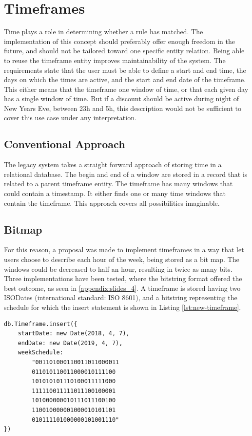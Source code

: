 \section{Timeframes}
Time plays a role in determining whether a rule has matched. The implementation of this concept should preferably offer enough freedom in the future, and should not be tailored toward one specific entity relation. Being able to reuse the timeframe entity improves maintainability of the system. The requirements state that the user must be able to define a start and end time, the days on which the times are active, and the start and end date of the timeframe. This either means that the timeframe one window of time, or that each given day has a single window of time. But if a discount should be active during night of New Years Eve, between 23h and 5h, this description would not be sufficient to cover this use case under any interpretation.

\subsection{Conventional Approach}
The legacy system takes a straight forward approach of storing time in a relational database. The begin and end of a window are stored in a record that is related to a parent timeframe entity. The timeframe has many windows that could contain a timestamp. It either finds one or many time windows that contain the timeframe. This approach covers all possibilities imaginable.

\subsection{Bitmap}
For this reason, a proposal was made to implement timeframes in a way that let users choose to describe each hour of the week, being stored as a bit map. The windows could be decreased to half an hour, resulting in twice as many bits. Three implementations have been tested, where the bitstring format offered the best outcome, as seen in \ref{appendix:slides_4}. A timeframe is stored having two ISODates (international standard: ISO 8601), and a bitstring representing the schedule for which the insert statement is shown in Listing \ref{lst:new-timeframe}.

\begin{center}
	\noindent\begin{minipage}{.45\textwidth}
		\begin{lstlisting}[caption={Improved timeframe.}, label={lst:new-timeframe}]
db.Timeframe.insert({
	startDate: new Date(2018, 4, 7),
	endDate: new Date(2019, 4, 7),
	weekSchedule:
		"001101000110011011000011
		011010110011000010111100
		101010101110100011111000
		111110011111011100100001
		101000000010111011100100
		110010000001000010101101
		010111101000000101001110"
})
\end{lstlisting}
	\end{minipage}
\end{center}

